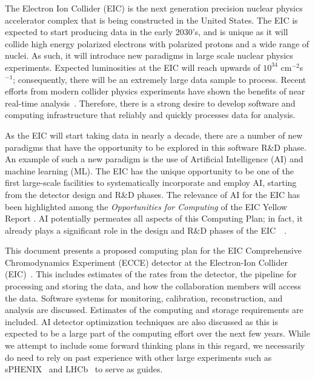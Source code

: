 

The Electron Ion Collider (EIC) is the next generation precision nuclear physics accelerator complex that is being constructed in the United States. The EIC is expected to start producing data in the early 2030's, and is unique as it will collide high energy polarized electrons with polarized protons and a wide range of nuclei. As such, it will introduce new paradigms in large scale nuclear physics experiments. Expected luminosities at the EIC will reach upwards of $10^{34}$ cm$^{-2}$s$^{-1}$; consequently, there will be an extremely large data sample to process. Recent efforts from modern collider physics experiments have shown the benefits of near real-time analysis~\cite{Benson_2015,Aaij_2019}. Therefore, there is a strong desire to develop software and computing infrastructure that reliably and quickly processes data for analysis. 



As the EIC will start taking data in nearly a decade, there are a number of new paradigms that have the opportunity to be explored in this software R\&D phase. An example of such a new paradigm is the use of Artificial Intelligence (AI) and machine learning (ML). The EIC has the unique opportunity to be one of the first large-scale facilities to systematically incorporate and employ AI, starting from the detector design and R\&D phases. The relevance of AI for the EIC has been highlighted among the \textit{Opportunities for Computing} of the EIC Yellow Report \cite{YellowReport}. AI potentially permeates all aspects of this Computing Plan; in fact, it already plays a significant role in the design and R\&D phases of the EIC~\cite{cisbani2020ai}~\cite{AI4EIC2021}.

This document presents a proposed computing plan for the EIC Comprehensive Chromodynamics Experiment (ECCE) detector at the Electron-Ion Collider (EIC)~\cite{YellowReport}. This includes estimates of the rates from the detector, the pipeline for processing and storing the data, and how the collaboration members will access the data. Software systems for monitoring, calibration, reconstruction, and analysis are discussed. Estimates of the computing and storage requirements are included. AI detector optimization techniques are also discussed as this is expected to be a large part of the computing effort over the next few years. While we attempt to include some forward thinking plans in this regard, we necessarily do need to rely on past experience with other large experiments such as sPHENIX~\cite{sphenix_computing_plan_2019} and LHCb~\cite{CAMPORAPEREZ2016280} to serve as guides.






